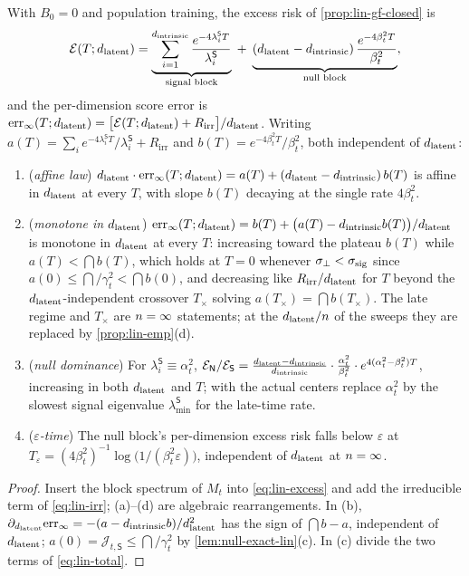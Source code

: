\begin{corollary}\label{cor:lin-blocks}
With $B_0=0$ and population training, the excess risk of \cref{prop:lin-gf-closed} is
\begin{equation}\label{eq:lin-total}
\mathcal E(T;d_{\mathrm{latent}})=\underbrace{\sum_{i=1}^{d_{\mathrm{intrinsic}}}\frac{e^{-4\lambda^{\mathsf S}_iT}}{\lambda^{\mathsf S}_i}}_{\text{signal block}}\;+\;\underbrace{(d_{\mathrm{latent}}-d_{\mathrm{intrinsic}})\,\frac{e^{-4\beta_t^2T}}{\beta_t^2}}_{\text{null block}},
\end{equation}
and the per-dimension score error is $\mathrm{err}_\infty(T;d_{\mathrm{latent}})=\big[\mathcal E(T;d_{\mathrm{latent}})+R_{\mathrm{irr}}\big]/d_{\mathrm{latent}}$. Writing $a(T)=\sum_i e^{-4\lambda_i^{\mathsf S}T}/\lambda^{\mathsf S}_i+R_{\mathrm{irr}}$ and $b(T)=e^{-4\beta_t^2T}/\beta_t^2$, both independent of $d_{\mathrm{latent}}$:
\begin{enumerate}
\item[(a)] (\emph{affine law}) $d_{\mathrm{latent}}\cdot\mathrm{err}_\infty(T;d_{\mathrm{latent}})=a(T)+(d_{\mathrm{latent}}-d_{\mathrm{intrinsic}})\,b(T)$ is affine in $d_{\mathrm{latent}}$ at every $T$, with slope $b(T)$ decaying at the single rate $4\beta_t^2$.
\item[(b)] (\emph{monotone in $d_{\mathrm{latent}}$}) $\mathrm{err}_\infty(T;d_{\mathrm{latent}})=b(T)+\big(a(T)-d_{\mathrm{intrinsic}} b(T)\big)/d_{\mathrm{latent}}$ is monotone in $d_{\mathrm{latent}}$ at every $T$: increasing toward the plateau $b(T)$ while $a(T)<\dint b(T)$, which holds at $T=0$ whenever $\sigma_{\perp}<\sigma_{\mathrm{sig}}$ since $a(0)\le\dint/\gamma_t^2<\dint b(0)$, and decreasing like $R_{\mathrm{irr}}/d_{\mathrm{latent}}$ for $T$ beyond the $d_{\mathrm{latent}}$-independent crossover $T_\times$ solving $a(T_\times)=\dint b(T_\times)$. The late regime and $T_\times$ are $n=\infty$ statements; at the $d_{\mathrm{latent}}/n$ of the sweeps they are replaced by \cref{prop:lin-emp}(d).
\item[(c)] (\emph{null dominance}) For $\lambda^{\mathsf S}_i\equiv\alpha_t^2$, $\mathcal E_{\mathsf N}/\mathcal E_{\mathsf S}=\frac{d_{\mathrm{latent}}-d_{\mathrm{intrinsic}}}{d_{\mathrm{intrinsic}}}\cdot\frac{\alpha_t^2}{\beta_t^2}\cdot e^{4(\alpha_t^2-\beta_t^2)T}$, increasing in both $d_{\mathrm{latent}}$ and $T$; with the actual centers replace $\alpha_t^2$ by the slowest signal eigenvalue $\lambda^{\mathsf S}_{\min}$ for the late-time rate.
\item[(d)] (\emph{$\varepsilon$-time}) The null block's per-dimension excess risk falls below $\varepsilon$ at $T_\varepsilon=(4\beta_t^2)^{-1}\log\big(1/(\beta_t^2\varepsilon)\big)$, independent of $d_{\mathrm{latent}}$ at $n=\infty$.
\end{enumerate}
\end{corollary}
\begin{proof}
Insert the block spectrum of $M_t$ into \eqref{eq:lin-excess} and add the irreducible term of \eqref{eq:lin-irr}; (a)--(d) are algebraic rearrangements. In (b), $\partial_{d_{\mathrm{latent}}}\mathrm{err}_\infty=-(a-d_{\mathrm{intrinsic}} b)/d_{\mathrm{latent}}^2$ has the sign of $\dint b-a$, independent of $d_{\mathrm{latent}}$; $a(0)=\mathcal J_{t,\mathsf S}\le\dint/\gamma_t^2$ by \cref{lem:null-exact-lin}(c). In (c) divide the two terms of \eqref{eq:lin-total}.
\end{proof}


